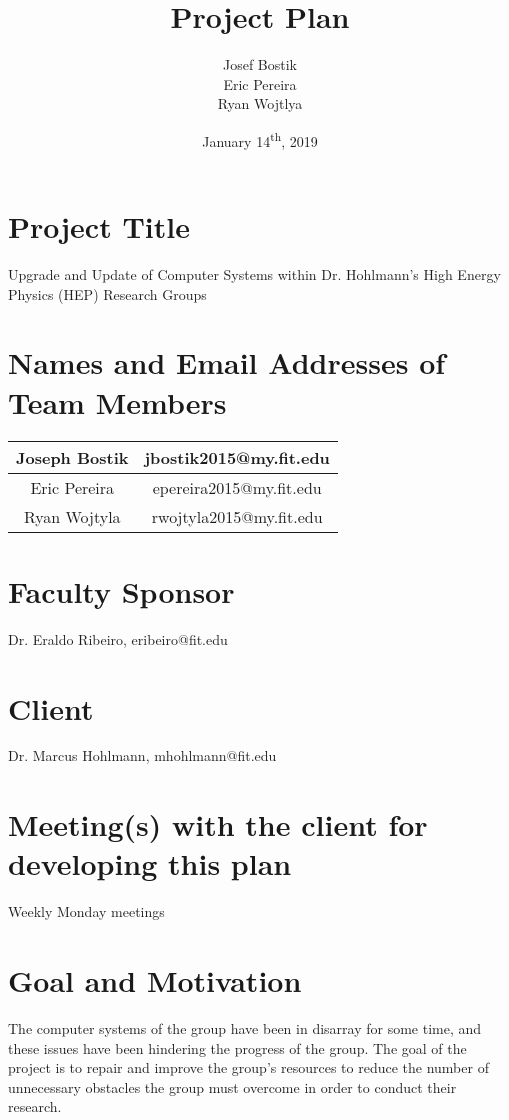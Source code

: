 \documentclass[12pt]{article}
\newcommand\tab[1][1cm]{\hspace*{#1}}
\begin{document}
\begin{titlepage}
	

\author{Josef Bostik\\
	Eric Pereira\\
	Ryan Wojtlya\\}
\date{January 14\textsuperscript{th}, 2019}
\title{Project Plan}
\maketitle
\end{titlepage}
\tableofcontents
\newpage
{}

\section{Project Title}
\tab Upgrade and Update of Computer Systems within Dr. Hohlmann's High Energy Physics (HEP) Research Groups
\section{Names and Email Addresses of Team Members}
\tab
\begin{tabular}{| c | c |}
	\hline
	Joseph Bostik & jbostik2015@my.fit.edu \\
	\hline
	Eric Pereira & epereira2015@my.fit.edu \\
	\hline
	Ryan Wojtyla & rwojtyla2015@my.fit.edu \\
	\hline
\end{tabular}

\section{Faculty Sponsor}
Dr. Eraldo Ribeiro, eribeiro@fit.edu

\section{Client}
Dr. Marcus Hohlmann, mhohlmann@fit.edu

\section{Meeting(s) with the client for developing this plan}
\tab Weekly Monday meetings

\section{Goal and Motivation}
The computer systems of the group have been in disarray for some time, and these issues have been hindering the progress of the group. The goal of the project is to repair and improve the group’s resources to reduce the number of unnecessary obstacles the group must overcome in order to conduct their research.
\end{document}
